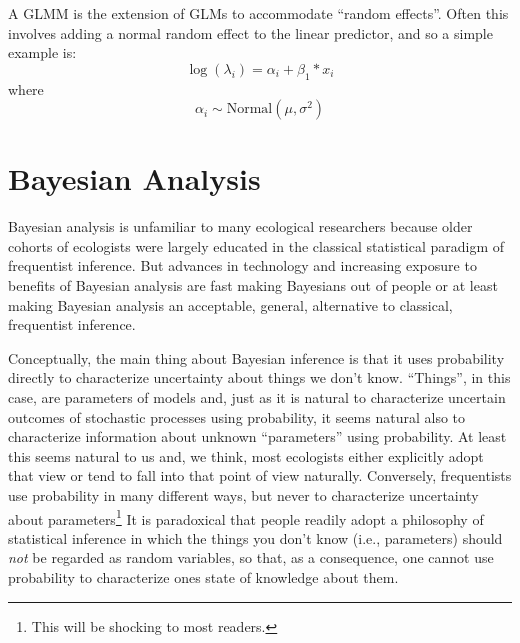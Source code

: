 A GLMM is the extension of GLMs to accommodate ``random
effects''. Often this involves adding a normal random effect to the
linear predictor, and so a simple example is:
\[
 \log(\lambda_{i}) = \alpha_{i} + \beta_{1}*x_{i}
\]
where
\[
 \alpha_{i} \sim \mbox{Normal}(\mu,\sigma^{2})
\]



\section{Bayesian Analysis}

Bayesian analysis is unfamiliar to many ecological researchers because older cohorts of ecologists were largely educated in the classical statistical paradigm of frequentist inference. But advances in technology and increasing exposure to benefits of Bayesian analysis are fast making Bayesians out of people or at least making Bayesian analysis an acceptable, general, alternative to classical, frequentist inference.  

Conceptually, the main thing about Bayesian inference is that it uses
probability directly to characterize uncertainty about things we don't
know.  ``Things'', in this case, are parameters of models and, just as
it is natural to characterize uncertain outcomes of stochastic
processes using probability, it seems natural also to characterize
information about unknown ``parameters'' using probability. At least
this seems natural to us and, we think, most ecologists either
explicitly adopt that view or tend to fall into that point of view
naturally. 
Conversely,
frequentists use probability in many different ways, but never to
characterize uncertainty about parameters\footnote{This will be
  shocking to most readers.}
It is paradoxical that people readily
adopt a philosophy of statistical inference in which the things you
don't know (i.e., parameters) should {\it not} be regarded as random
variables, so that, as a consequence, one cannot use probability to
characterize ones state of knowledge about them. 


